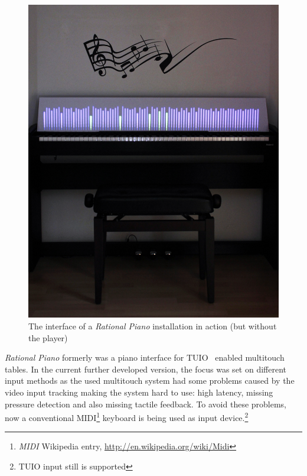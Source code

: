 \documentclass[12pt,a4paper,titlepage,oneside]{report}
\begin{document}
\begin{figure}[htbp]
\includegraphics[width=\textwidth]{images/interface_foto.jpg}
\centering
\caption{The interface of a \emph{Rational Piano} installation in action (but without the player)}
\label{fig:interface_foto}
\end{figure}

\emph{Rational Piano} formerly was a piano interface for TUIO~\cite{bib:tuio} enabled multitouch tables. In the current further developed version, the focus was set on different input methods as the used multitouch system had some problems caused by the video input tracking making the system hard to use: high latency, missing pressure detection and also missing tactile feedback. To avoid these problems, now a conventional MIDI\footnote{\emph{MIDI} Wikipedia entry, \url{http://en.wikipedia.org/wiki/Midi}} keyboard is being used as input device.\footnote{TUIO input still is supported}

\end{document}
